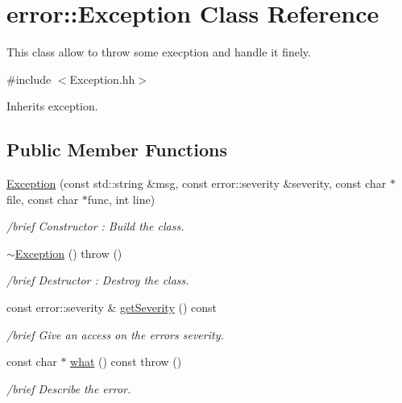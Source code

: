 \hypertarget{classerror_1_1Exception}{}\section{error\+:\+:Exception Class Reference}
\label{classerror_1_1Exception}


This class allow to throw some execption and handle it finely.  




{\ttfamily \#include $<$Exception.\+hh$>$}



Inherits exception.

\subsection*{Public Member Functions}
\begin{DoxyCompactItemize}
\item 
\hyperlink{classerror_1_1Exception_ae9193ed1c5b211c31c239c5f30caefb4}{Exception} (const std\+::string \&msg, const error\+::severity \&severity, const char $\ast$file, const char $\ast$func, int line)
\begin{DoxyCompactList}\small\item\em /brief Constructor \+: Build the class. \end{DoxyCompactList}\item 
\hyperlink{classerror_1_1Exception_a1350d8f9d039facfd991b6782387eae5}{$\sim$\+Exception} ()  throw ()
\begin{DoxyCompactList}\small\item\em /brief Destructor \+: Destroy the class. \end{DoxyCompactList}\item 
const error\+::severity \& \hyperlink{classerror_1_1Exception_a05f9c8eecf03bb0ca05d5fe2ec7fb36a}{get\+Severity} () const
\begin{DoxyCompactList}\small\item\em /brief Give an access on the error\textquotesingle{}s severity. \end{DoxyCompactList}\item 
const char $\ast$ \hyperlink{classerror_1_1Exception_a30163f5666745344a3aeba609727fb5a}{what} () const  throw ()
\begin{DoxyCompactList}\small\item\em /brief Describe the error. \end{DoxyCompactList}\end{DoxyCompactItemize}


